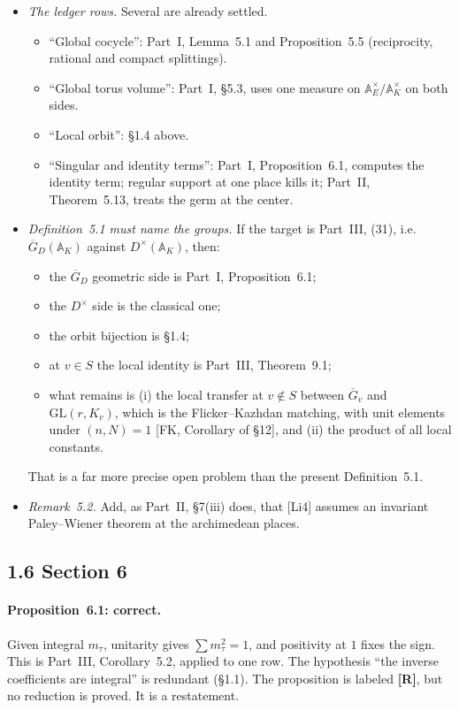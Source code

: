\documentclass[11pt]{article}
\newcommand{\GL}{\mathrm{GL}}
\newcommand{\A}{\mathbb A}
\newcommand{\Gb}{\overline G}
\newcommand{\GDb}{\overline G_D}
\theoremstyle{definition}
\begin{document}
\begin{itemize}
\begin{itemize}
\end{itemize}
The local transfer at split places, and the bookkeeping of these kernels
against the single global $s$ of \S1.4, must be stated explicitly.
\item \emph{The ledger rows.} Several are already settled.
\begin{itemize}
\item ``Global cocycle'': Part~I, Lemma~5.1 and Proposition~5.5
(reciprocity, rational and compact splittings).
\item ``Global torus volume'': Part~I, \S5.3, uses one measure on
$\A_E^\times/\A_K^\times$ on both sides.
\item ``Local orbit'': \S1.4 above.
\item ``Singular and identity terms'': Part~I, Proposition~6.1, computes the
identity term; regular support at one place kills it; Part~II,
Theorem~5.13, treats the germ at the center.
\end{itemize}
\item \emph{Definition~5.1 must name the groups.} If the target is
Part~III, (31), i.e.\ $\GDb(\A_K)$ against $D^\times(\A_K)$, then:
\begin{itemize}
\item the $\GDb$ geometric side is Part~I, Proposition~6.1;
\item the $D^\times$ side is the classical one;
\item the orbit bijection is \S1.4;
\item at $v\in S$ the local identity is Part~III, Theorem~9.1;
\item what remains is (i) the local transfer at $v\notin S$ between
$\Gb_v$ and $\GL(r,K_v)$, which is the Flicker--Kazhdan matching, with
unit elements under $(n,N)=1$ [FK, Corollary of \S12], and (ii) the
product of all local constants.
\end{itemize}
That is a far more precise open problem than the present Definition~5.1.
\item \emph{Remark~5.2.} Add, as Part~II, \S7(iii) does, that [Li4]
assumes an invariant Paley--Wiener theorem at the archimedean places.
\end{itemize}

\subsection*{1.6 Section 6}
\paragraph{Proposition~6.1: correct.} Given integral $m_\tau$, unitarity
gives $\sum m_\tau^2=1$, and positivity at $1$ fixes the sign. This is
Part~III, Corollary~5.2, applied to one row. The hypothesis ``the inverse
coefficients are integral'' is redundant (\S1.1). The proposition is
labeled \textbf{[R]}, but no reduction is proved. It is a restatement.
\end{document}
